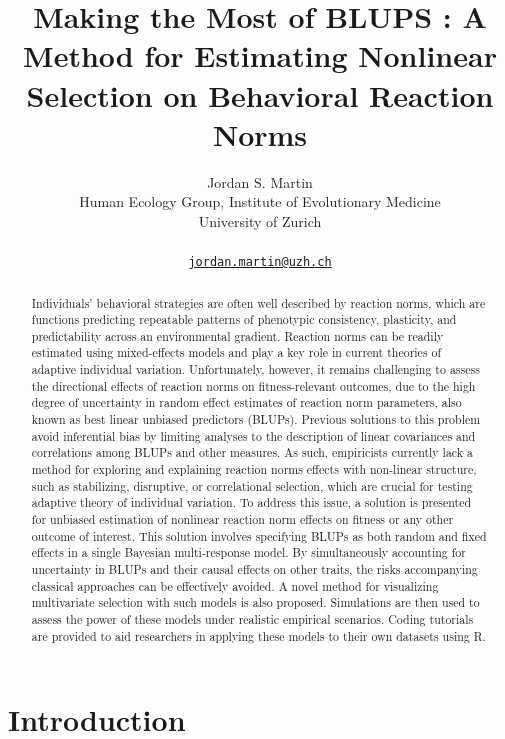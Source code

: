 \documentclass{article}
\title{Making the Most of BLUPS : \linebreak A Method for Estimating
Nonlinear Selection \linebreak on Behavioral Reaction Norms}
\author{
    Jordan S. Martin
   \\
    Human Ecology Group, Institute of Evolutionary Medicine \\
    University of Zurich \\
   \\
  \texttt{\href{mailto:jordan.martin@uzh.ch}{\nolinkurl{jordan.martin@uzh.ch}}} \\
  }
\begin{document}
\maketitle

\def\tightlist{}


\begin{abstract}
Individuals' behavioral strategies are often well described by reaction
norms, which are functions predicting repeatable patterns of phenotypic
consistency, plasticity, and predictability across an environmental
gradient. Reaction norms can be readily estimated using mixed-effects
models and play a key role in current theories of adaptive individual
variation. Unfortunately, however, it remains challenging to assess the
directional effects of reaction norms on fitness-relevant outcomes, due
to the high degree of uncertainty in random effect estimates of reaction
norm parameters, also known as best linear unbiased predictors (BLUPs).
Previous solutions to this problem avoid inferential bias by limiting
analyses to the description of linear covariances and correlations among
BLUPs and other measures. As such, empiricists currently lack a method
for exploring and explaining reaction norms effects with non-linear
structure, such as stabilizing, disruptive, or correlational selection,
which are crucial for testing adaptive theory of individual variation.
To address this issue, a solution is presented for unbiased estimation
of nonlinear reaction norm effects on fitness or any other outcome of
interest. This solution involves specifying BLUPs as both random and
fixed effects in a single Bayesian multi-response model. By
simultaneously accounting for uncertainty in BLUPs and their causal
effects on other traits, the risks accompanying classical approaches can
be effectively avoided. A novel method for visualizing multivariate
selection with such models is also proposed. Simulations are then used
to assess the power of these models under realistic empirical scenarios.
Coding tutorials are provided to aid researchers in applying these
models to their own datasets using R.
\end{abstract}


\hypertarget{introduction}{%
\section{Introduction}\label{introduction}}
\end{document}
